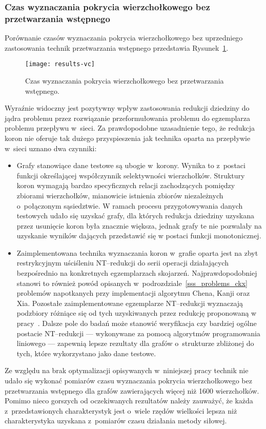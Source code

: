 \subsubsection{\textbf{Czas wyznaczania pokrycia wierzchołkowego bez przetwarzania wstępnego}}\label{time_vc}
\par{
  Porównanie czasów wyznaczania pokrycia wierzchołkowego bez uprzedniego zastosowania technik przetwarzania wstępnego przedstawia Rysunek~\ref{fig_results_vc}.
  \begin{figure}
    \caption{Czas wyznaczania pokrycia wierzchołkowego bez przetwarzania wstępnego.}
    \label{fig_results_vc}
    \centering
      \texttt{[image: results-vc]}
  \end{figure}
  Wyraźnie widoczny jest pozytywny wpływ zastosowania redukcji dziedziny do jądra problemu przez rozwiązanie przeformułowania problemu do egzemplarza problemu przepływu w~sieci.
  Za prawdopodobne uzasadnienie tego, że redukcja koron nie oferuje tak dużego przyspieszenia jak technika oparta na przepływie w~sieci uznano dwa czynniki:
  \begin{itemize}
    \item Grafy stanowiące dane testowe są ubogie w~korony.
    Wynika to z~postaci funkcji określającej współczynnik selektywności wierzchołków. Struktury koron wymagają bardzo specyficznych relacji zachodzących pomiędzy zbiorami wierzchołków, mianowicie istnienia zbiorów niezależnych o~połączonym sąsiedztwie.
    W ramach procesu przygotowywania danych testowych udało się uzyskać grafy, dla których redukcja dziedziny uzyskana przez usunięcie koron była znacznie większa, jednak grafy te nie pozwalały na uzyskanie wyników dających przedstawić się w postaci funkcji monotonicznej.
    \item Zaimplementowana technika wyznaczania koron w~grafie oparta jest na zbyt restrykcyjnym uściśleniu NT--redukcji do serii operacji działających bezpośrednio na konkretnych egzemplarzach skojarzeń.
    Najprawdopodobniej stanowi to również powód opisanych w~podrozdziale~\ref{sss_problems_ckx} problemów napotkanych przy implementacji algorytmu Chena, Kanji oraz Xia.
    Pozostałe zaimplementowane egzemplarze NT--redukcji wyznaczają podzbiory różniące się od tych uzyskiwanych przez redukcję proponowaną w pracy~\cite{KernelizationAlgorithms04}.
    Dalsze pole do badań może stanowić weryfikacja czy bardziej ogólne postacie NT--redukcji --- wykonywane za pomocą algorytmów programowania liniowego --- zapewnią lepsze rezultaty dla grafów o~strukturze zbliżonej do tych, które wykorzystano jako dane testowe.
  \end{itemize}

  Ze względu na brak optymalizacji opisywanych w~niniejszej pracy technik nie udało się wykonać pomiarów czasu wyznaczania pokrycia wierzchołkowego bez przetwarzania wstępnego dla grafów zawierających więcej niż 1600 wierzchołków.
  Pomimo nieco gorszych od oczekiwanych rezultatów należy zauważyć, że każda z~przedstawionych charakterystyk jest o~wiele rzędów wielkości lepsza niż charakterystyka uzyskana z~pomiarów czasu działania metody siłowej.
}
